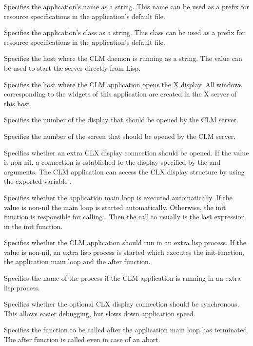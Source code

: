 \begin{lispd}
\begin{paramd}
 Specifies the application's name as a string.  This
name can be used as a prefix for resource specifications in the application's
default file. 

 Specifies the application's class as a string.  This
class can be used as a prefix for resource specifications in the application's
default file. 

 Specifies the host where the CLM daemon is running
as a string.
The value  can be used to start the server directly from Lisp.

 Specifies the host where the CLM application opens
the X display. All windows corresponding to the widgets of this application 
are created in the X server of this host. 

 Specifies the number of the display that should be 
opened by the CLM server.

 Specifies the number of the screen that should be 
opened by the CLM server.

 Specifies whether an extra CLX display connection should be 
opened.  If the value is non-nil, a connection is established to the display 
specified by the  and  arguments.
The CLM application can access the CLX display structure by using the
exported variable .

 Specifies whether the application main loop is
executed automatically. If the value is non-nil the main loop is started
automatically. Otherwise, the init function is responsible for calling
. Then the call to  usually is the
last expression in the init function.

 Specifies whether the CLM application should run in
an extra lisp process. If the value is non-nil, an extra lisp process is 
started which executes the init-function, the application main loop and
the after function.

 Specifies the name of the process if the CLM application
is running in an extra lisp process.

 Specifies whether the optional CLX display connection should
be synchronous.  This allows easier debugging, but slows down application speed.

 Specifies the function to be called after the
application main loop has terminated. The after function is called even in case
of an abort.


\end{paramd}
\end{lispd}
